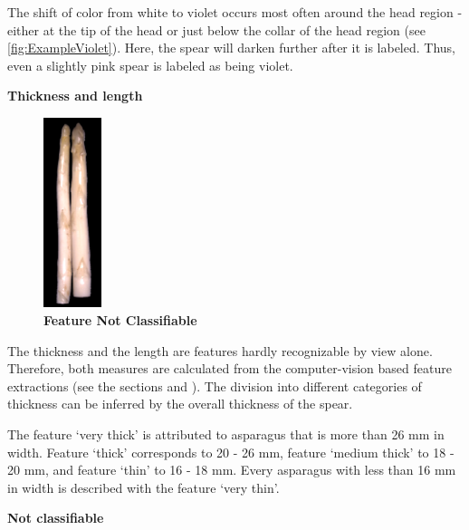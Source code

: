 The shift of color from white to violet occurs most often around the head region - either at the tip of the head or just below the collar of the head region (see \autoref{fig:ExampleViolet}).
Here, the spear will darken further after it is labeled. Thus, even a slightly pink spear is labeled as being violet.

\vspace{8cm}
\textbf{Thickness and length}

\begin{figure}
  \centering
  \includegraphics[width=0.15\textwidth]{Figures/chapter03/example_img_thick.png}
  \caption[Example Image Not Classifiable]{ \textbf{Feature Not Classifiable}}
  \label{fig:ExampleThickness}
\end{figure}

The thickness and the length are features hardly recognizable by view alone. Therefore, both measures are calculated from the computer-vision based feature extractions (see the sections  and ). The division into different categories of thickness can be inferred by the overall thickness of the spear.

The feature ‘very thick’ is attributed to asparagus that is more than 26 mm in width. Feature ‘thick’ corresponds to 20 - 26 mm, feature ‘medium thick’ to 18 - 20 mm, and feature ‘thin’ to 16 - 18 mm. Every asparagus with less than 16 mm in width is described with the feature ‘very thin’.

\bigskip
\textbf{Not classifiable}


